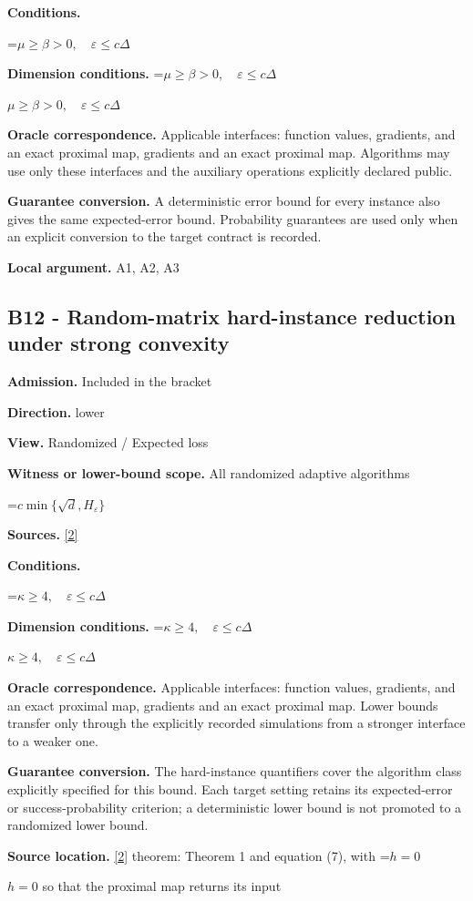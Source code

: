 \documentclass[10pt,a4paper]{article}
\newcommand{\AtlasMath}[1]{\par\begingroup\centering\setbox0=\hbox{$\displaystyle #1$}\ifdim\wd0>1.4\linewidth\typeout{ATLAS WIDE FORMULA: \the\wd0}\fi\ifdim\wd0>\linewidth\resizebox{\linewidth}{!}{\box0}\else\box0\fi\par\endgroup}
\newcommand{\AtlasInlineMath}[1]{\begingroup\setbox0=\hbox{$#1$}\ifdim\wd0>.4\linewidth\endgroup\AtlasMath{#1}\else\endgroup$#1$\fi}
\begin{document}
\textbf{Conditions.} 
\AtlasMath{\mu\ge\beta>0,\quad\varepsilon\le c\Delta}


\textbf{Dimension conditions.} \AtlasInlineMath{\mu\ge\beta>0,\quad\varepsilon\le c\Delta}

\textbf{Oracle correspondence.} Applicable interfaces: function values, gradients, and an exact proximal map, gradients and an exact proximal map. Algorithms may use only these interfaces and the auxiliary operations explicitly declared public.

\textbf{Guarantee conversion.} A deterministic error bound for every instance also gives the same expected-error bound. Probability guarantees are used only when an explicit conversion to the target contract is recorded.

\textbf{Local argument.} A1, A2, A3

\subsection{B12 - Random-matrix hard-instance reduction under strong convexity}
\textbf{Admission.} Included in the bracket

\textbf{Direction.} lower

\textbf{View.} Randomized / Expected loss

\textbf{Witness or lower-bound scope.} All randomized adaptive algorithms

\AtlasMath{c\min\{\sqrt d,H_\varepsilon\}}
\textbf{Sources.} \href{https://arxiv.org/pdf/2609.10874}{[2]}

\textbf{Conditions.} 
\AtlasMath{\kappa\ge4,\quad\varepsilon\le c\Delta}


\textbf{Dimension conditions.} \AtlasInlineMath{\kappa\ge4,\quad\varepsilon\le c\Delta}

\textbf{Oracle correspondence.} Applicable interfaces: function values, gradients, and an exact proximal map, gradients and an exact proximal map. Lower bounds transfer only through the explicitly recorded simulations from a stronger interface to a weaker one.

\textbf{Guarantee conversion.} The hard-instance quantifiers cover the algorithm class explicitly specified for this bound. Each target setting retains its expected-error or success-probability criterion; a deterministic lower bound is not promoted to a randomized lower bound.

\textbf{Source location.} \href{https://arxiv.org/pdf/2609.10874}{[2]} theorem: Theorem 1 and equation (7), with \AtlasInlineMath{h=0} so that the proximal map returns its input
\end{document}

